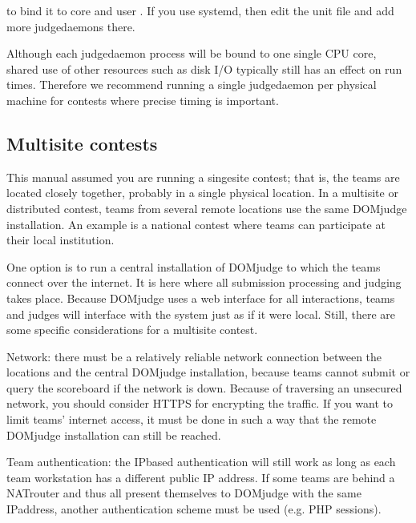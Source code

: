 \documentclass[a4paper,10pt,english,openany]{sphinxmanual}
\begin{document}
\sphinxAtStartPar
to bind it to core  and user . If you use
systemd, then edit the  unit file and add
more judgedaemons there.

\sphinxAtStartPar
Although each judgedaemon process will be bound to one single CPU
core, shared use of other resources such as disk I/O typically
still has an effect on run times.
Therefore we recommend running a single judgedaemon per physical
machine for contests where precise timing is important.


\subsection{Multi\sphinxhyphen{}site contests}
\label{\detokenize{config-advanced:multi-site-contests}}
\sphinxAtStartPar
This manual assumed you are running a singe\sphinxhyphen{}site contest; that is, the teams
are located closely together, probably in a single physical location. In a
multi\sphinxhyphen{}site or distributed contest, teams from several remote locations use the
same DOMjudge installation. An example is a national contest where teams can
participate at their local institution.

\sphinxAtStartPar
One option is to run a central installation of
DOMjudge to which the teams connect over the internet. It is here where
all submission processing and judging takes place. Because DOMjudge uses a web
interface for all interactions, teams and judges will interface with the system
just as if it were local.  Still, there are some specific considerations for a
multi\sphinxhyphen{}site contest.

\sphinxAtStartPar
Network: there must be a relatively reliable network connection between the
locations and the central DOMjudge installation, because teams cannot submit or
query the scoreboard if the network is down. Because of traversing an unsecured
network, you should consider HTTPS for encrypting the traffic.  If you
want to limit teams’ internet access, it must be done in such a way that the remote
DOMjudge installation can still be reached.

\sphinxAtStartPar
Team authentication: the IP\sphinxhyphen{}based authentication will still work as long as
each team workstation has a different public IP address. If some teams are
behind a NAT\sphinxhyphen{}router and thus all present themselves to DOMjudge with the same
IP\sphinxhyphen{}address, another authentication scheme must be used (e.g. PHP sessions).
\end{document}
